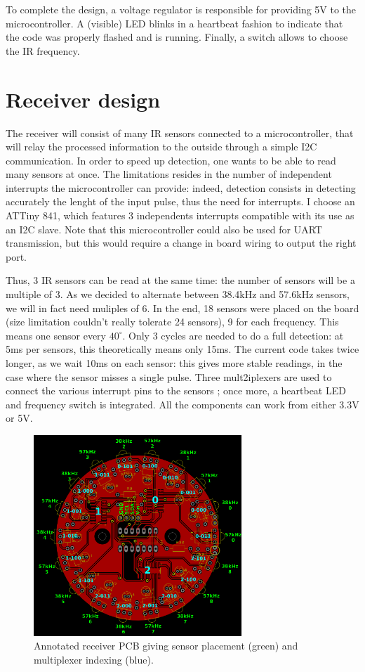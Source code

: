 \documentclass[a4paper,11pt]{article}
\begin{document}
To complete the design, a voltage regulator is responsible for providing 5V to the microcontroller. A (visible) LED blinks in a heartbeat fashion to indicate that the code was properly flashed and is running. Finally, a switch allows to choose the IR frequency.

\section{Receiver design}

The receiver will consist of many IR sensors connected to a microcontroller, that will relay the processed information to the outside through a simple I2C communication. In order to speed up detection, one wants to be able to read many sensors at once. The limitations resides in the number of independent interrupts the microcontroller can provide: indeed, detection consists in detecting accurately the lenght of the input pulse, thus the need for interrupts. I choose an ATTiny 841, which features 3 independents interrupts compatible with its use as an I2C slave. Note that this microcontroller could also be used for UART transmission, but this would require a change in board wiring to output the right port.

Thus, 3 IR sensors can be read at the same time: the number of sensors will be a multiple of 3. As we decided to alternate between 38.4kHz and 57.6kHz sensors, we will in fact need muliples of 6. In the end, 18 sensors were placed on the board (size limitation couldn't really tolerate 24 sensors), 9 for each frequency. This means one sensor every $40^\circ$. Only 3 cycles are needed to do a full detection: at 5ms per sensors, this theoretically means only 15ms. The current code takes twice longer, as we wait 10ms on each sensor: this gives more stable readings, in the case where the sensor misses a single pulse. Three mult2iplexers are used to connect the various interrupt pins to the sensors ; once more, a heartbeat LED and frequency switch is integrated. All the components can work from either 3.3V or 5V.

\begin{figure}[h]
  \centering
  \includegraphics[width=0.7\textwidth]{Figures/IC_Documentation_Reciever.pdf}
  \caption{Annotated receiver PCB giving sensor placement (green) and multiplexer indexing (blue).}
  \label{fReceiverDoc}
\end{figure}
\end{document}
